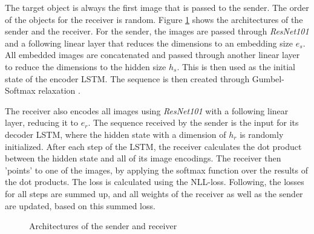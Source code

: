 \documentclass[11pt]{article}
\begin{document}


The target object is always the first image that is passed to the sender.
The order of the objects for the receiver is random.
Figure \ref*{fig:architectures} shows the architectures of the sender and the receiver.
For the sender, the images are passed through \emph{ResNet101} \citep{He2016} and a following linear layer that reduces the dimensions to an embedding size $e_s$.
All embedded images are concatenated and passed through another linear layer to reduce the dimensions to the hidden size $h_s$.
This is then used as the initial state of the encoder LSTM.
The sequence is then created through Gumbel-Softmax relaxation \citep{Jang2016}.

The receiver also encodes all images using \emph{ResNet101} with a following linear layer, reducing it to $e_r$.
The sequence received by the sender is the input for its decoder LSTM, where the hidden state with a dimension of $h_r$ is randomly initialized.
After each step of the LSTM, the receiver calculates the dot product between the hidden state and all of its image encodings.
The receiver then 'points' to one of the images, by applying the softmax function over the results of the dot products.
The loss is calculated using the NLL-loss.
Following, the losses for all steps are summed up, and all weights of the receiver as well as the sender are updated, based on this summed loss.

\begin{figure}[h]
  \centering
  \caption{Architectures of the sender and receiver}
  \label{fig:architectures}
\end{figure}
\end{document}
